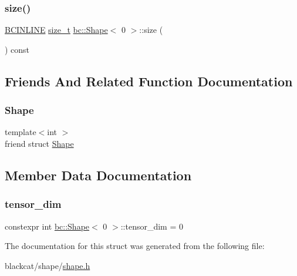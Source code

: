 \mbox{\label{structbc_1_1Shape_3_010_01_4_af880e315f0a7cad4c6873917a8af636a}} 
\subsubsection{\texorpdfstring{size()}{size()}}
{\footnotesize\ttfamily \hyperlink{common_8h_a6699e8b0449da5c0fafb878e59c1d4b1}{B\+C\+I\+N\+L\+I\+NE} \hyperlink{structbc_1_1Shape_3_010_01_4_a7bf4db55cfc575f40871044048ea5c03}{size\+\_\+t} \hyperlink{structbc_1_1Shape}{bc\+::\+Shape}$<$ 0 $>$\+::size (\begin{DoxyParamCaption}{ }\end{DoxyParamCaption}) const\hspace{0.3cm}{\ttfamily [inline]}}



\subsection{Friends And Related Function Documentation}
\mbox{\label{structbc_1_1Shape_3_010_01_4_ab0bde87b11c5c08fec2f2325317820de}} 
\subsubsection{\texorpdfstring{Shape}{Shape}}
{\footnotesize\ttfamily template$<$int $>$ \\
friend struct \hyperlink{structbc_1_1Shape}{Shape}\hspace{0.3cm}{\ttfamily [friend]}}



\subsection{Member Data Documentation}
\mbox{\label{structbc_1_1Shape_3_010_01_4_a51538fcebc3d3462b672ac7e5d3e77c5}} 
\subsubsection{\texorpdfstring{tensor\+\_\+dim}{tensor\_dim}}
{\footnotesize\ttfamily constexpr int \hyperlink{structbc_1_1Shape}{bc\+::\+Shape}$<$ 0 $>$\+::tensor\+\_\+dim = 0\hspace{0.3cm}{\ttfamily [static]}}



The documentation for this struct was generated from the following file\+:\begin{DoxyCompactItemize}
\item 
blackcat/shape/\hyperlink{shape_2shape_8h}{shape.\+h}\end{DoxyCompactItemize}
